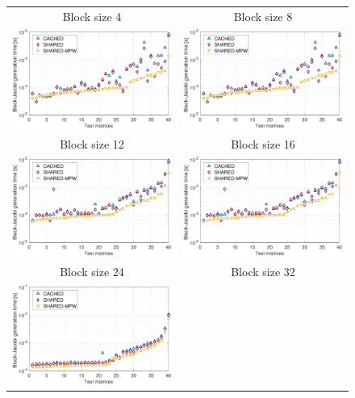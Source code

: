 \begin{figure}[t]
\begin{center}
{\scriptsize
\begin{tabular}{cc}
\hline
Block size 4 & Block size 8\\
\includegraphics[width=.46\columnwidth]{plots/BJ_generation_time_4.pdf}&
\includegraphics[width=.46\columnwidth]{plots/BJ_generation_time_8.pdf}\\
\hline
Block size 12 & Block size 16\\
\includegraphics[width=.46\columnwidth]{plots/BJ_generation_time_12.pdf}&
\includegraphics[width=.46\columnwidth]{plots/BJ_generation_time_16.pdf}\\
\hline
Block size 24 & Block size 32\\
\includegraphics[width=.46\columnwidth]{plots/BJ_generation_time_24.pdf}&

\end{tabular}}
\end{center}
\end{figure}
